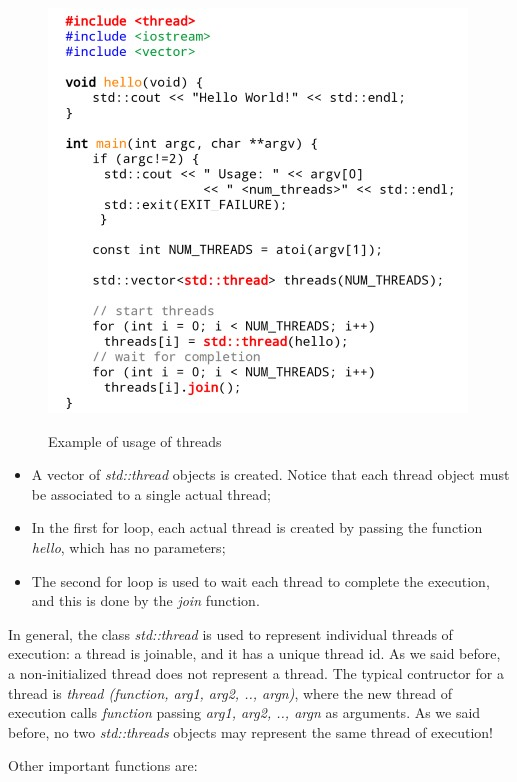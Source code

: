 \begin{figure}[h!]
		\centering
		\includegraphics[scale = 1.7]{img/pthreads example.jpg}
        \label{pthreads example}
        \caption{Example of usage of threads}
\end{figure}

\begin{itemize}
    \item A vector of \textit{std::thread} objects is created. Notice that each thread object must be associated to a single actual thread;
    \item In the first for loop, each actual thread is created by passing the function \textit{hello}, which has no parameters;
    \item The second for loop is used to wait each thread to complete the execution, and this is done by the \textit{join} function.
\end{itemize}

In general, the class \textit{std::thread} is used to represent individual threads of execution: a thread is joinable, and it has a unique thread id. As we said before, a non-initialized thread does not represent a thread. The typical contructor for a thread is \textit{thread (function, arg1, arg2, .., argn)}, where the new thread of execution calls \textit{function} passing \textit{arg1, arg2, .., argn} as arguments. As we said before, no two \textit{std::threads} objects may represent the same thread of execution!

Other important functions are:

